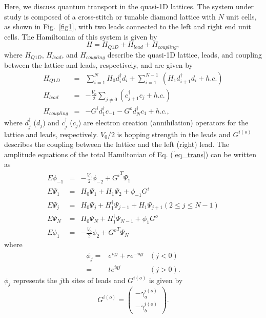 \documentclass[twocolumn,showpacs,epsfig,pre]{revtex4}
\begin{document}
Here, we discuss quantum transport in the quasi-1D lattices.
The system under study is composed of a cross-stitch or tunable diamond lattice with $N$ unit cells, as shown in Fig.~\ref{fig1},
with two leads connected to the left and right end unit cells.
The Hamiltonian of this system is given by
\begin{equation}
 H = H_{Q1D} + H_{lead} + H_{coupling},
\label{eq_trans}
\end{equation}
where $H_{Q1D}$, $H_{lead}$, and $H_{coupling}$ describe the quasi-1D lattice, leads, and coupling between the lattice and leads, respectively, and are given by
\begin{eqnarray}
 H_{Q1D} &=& \sum_{i=1}^{N}H_0 d_{i}^{\dagger} d_{i} + \sum_{i=1}^{N-1} ~(H_{1} d_{i+1}^{\dagger} d_{i} + h.c.) \\
 H_{lead} &=& -\frac{V_0}{2} \sum_{j \neq 0} (c_{j+1}^{\dagger} c_{j} + h.c.) \\
 H_{coupling} &=& - G^i d_{1}^{\dagger} c_{-1} - G^o d_{N}^{\dagger} c_{1} + h.c.,
\end{eqnarray}
where $d_{j}^{\dagger}$ ($d_j$) and $c_{j}^{\dagger}$ ($c_j$) are electron creation (annihilation) operators for the lattice and leads, respectively. $V_0 / 2$ is hopping strength in the leads and $G^{i(o)}$ describes the coupling between the lattice and the left (right) lead. The amplitude equations of the total Hamiltonian of Eq. (\ref{eq_trans}) can be written as
\begin{eqnarray}
 E \phi_{-1} &=& -\frac{V_0}{2} \phi_{-2} + {G^i}^T  \Psi_1\\
 \label{leftc}
 E \Psi_{1} &=& H_{0} \Psi_{1} + H_{1} \Psi_{2} + \phi_{-1} {G^i} \\
 E \Psi_{j} &=& H_{0} \Psi_{j} + H_{1}^{\dagger} \Psi_{j-1} + H_{1} \Psi_{j+1} (2 \leq j \leq N-1) \\
 \label{rightc}
 E \Psi_{N} &=& H_{0} \Psi_{N} + H_{1}^{\dagger} \Psi_{N-1} + \phi_{1} {G^o}\\
 E \phi_{1} &=& -\frac{V_0}{2} \phi_{2} + {G^o}^T \Psi_N 
\end{eqnarray}
where
\begin{eqnarray}
 \phi_{j} =& e^{i q j} + r e^{-i q j} & (j < 0) \\
          =& t e^{i q j} & (j > 0). 
\end{eqnarray}
$\phi_{j}$ represents the $j$th sites of leads and $G^{i(o)}$ is given by
\begin{equation}
\label{geq}
G^{i(o)} = \left(\begin{array}{c}
 -\gamma_a^{i(o)} \\
 -\gamma_b^{i(o)} 
\end{array}\right).
\end{equation}
\end{document}
